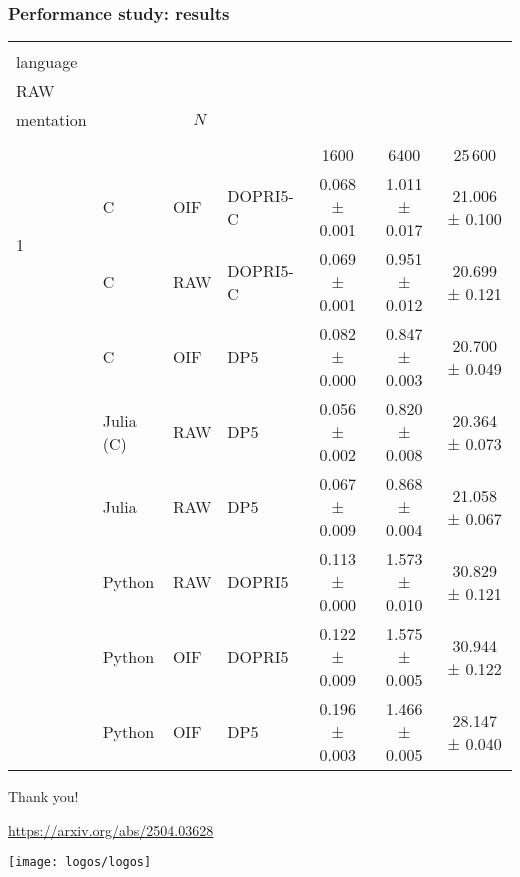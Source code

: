 \documentclass[10pt, aspectratio=169, progressbar=frametitle]{beamer}
\newcommand{\headerWithBreaks}[2]{{%
\multirow{2}{*}{%
  \begin{minipage}[t]{#1}{#2}\end{minipage}
}
}}
\newcommand{\myheader}{%
\headerWithBreaks{0.2em}{\#} &
\headerWithBreaks{3em}{User\\language} &
\headerWithBreaks{1.5em}{OIF/\\RAW} &
\headerWithBreaks{3em}{Imple-\\mentation} &
                                \multicolumn{3}{c}{$N$} \\
                                \cmidrule(lr){5-7}
}
\begin{document}
\begin{frame}
  \frametitle{Performance study: results}

  \vspace{1em}
  \centering
  \begin{tabular}{l l l l c c c}
    \toprule
    \myheader                                                                                        \\
                      &           &     &          & 1600          & 6400          & 25\,600    \\
    \midrule
    \multirow{2}{*}{1} & C        & OIF & DOPRI5-C & 0.068 ± 0.001 & 1.011 ± 0.017 & 21.006 ± 0.100 \\
                      & C         & RAW & DOPRI5-C & 0.069 ± 0.001 & 0.951 ± 0.012 & 20.699 ± 0.121 \\
    \addlinespace
    \addlinespace
    \multirow{3}{*}{2} & C        & OIF & DP5      & 0.082 ± 0.000 & 0.847 ± 0.003 & 20.700 ± 0.049 \\
                      & Julia (C) & RAW & DP5      & 0.056 ± 0.002 & 0.820 ± 0.008 & 20.364 ± 0.073 \\
                      & Julia     & RAW & DP5      & 0.067 ± 0.009 & 0.868 ± 0.004 & 21.058 ± 0.067 \\
    \addlinespace
    \addlinespace
    \multirow{3}{*}{3} & Python   & RAW & DOPRI5   & 0.113 ± 0.000 & 1.573 ± 0.010 & 30.829 ± 0.121 \\
                      & Python    & OIF & DOPRI5   & 0.122 ± 0.009 & 1.575 ± 0.005 & 30.944 ± 0.122 \\
                      & Python    & OIF & DP5      & 0.196 ± 0.003 & 1.466 ± 0.005 & 28.147 ± 0.040 \\
    \bottomrule
  \end{tabular}
\end{frame}

% 

\begin{frame}
  \centering
  \vspace{9em}
  \huge{Thank you!}

  {\Large \url{https://arxiv.org/abs/2504.03628}}

  \vspace{1em}
  \texttt{[image: logos/logos]}
\end{frame}
\end{document}
